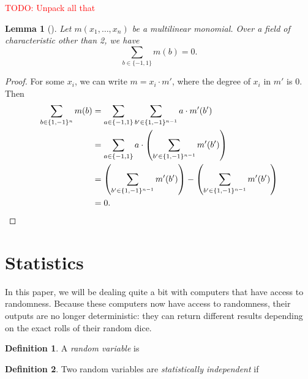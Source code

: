 \documentclass[english,12pt]{reedthesis}
\theoremstyle{plain}
\newtheorem{lemma}[lemma]{Lemma}
\theoremstyle{definition}
\newtheorem{defn}[defn]{Definition}
\theoremstyle{remark}
\newcommand{\TODO}[1]{\textcolor{red}{TODO: #1}}
\begin{document}
\TODO{Unpack all that}

\begin{lemma}[{\cite[Lemma 7]{JKRS09}}]\label{lem:monomial-sum}
  Let $m(x_{1}, \ldots, x_{n})$ be a multilinear monomial. Over a field of
  characteristic other than 2, we have
  \begin{equation}
    \sum_{b \in \{-1, 1\}}m(b) = 0.
  \end{equation}
\end{lemma}

\begin{proof}
  For some $x_{i}$, we can write $m = x_{i} \cdot m'$, where the degree of $x_{i}$
  in $m'$ is 0. Then
  \begin{align*}
    \sum_{b \in \{1, -1\}^{n}}m(b)
    &= \sum_{a \in \{-1, 1\}}\sum_{b' \in \{1, -1\}^{n-1}}a \cdot m'(b') \\
    &= \sum_{a \in \{-1, 1\}} a \cdot \mleft(\sum_{b' \in \{1, -1\}^{n-1}} m'(b')\mright) \\
    &= \mleft(\sum_{b' \in \{1, -1\}^{n-1}} m'(b')\mright) - \mleft(\sum_{b' \in \{1, -1\}^{n-1}} m'(b')\mright) \\
    &= 0.
  \end{align*}
\end{proof}

\section{Statistics}

In this paper, we will be dealing quite a bit with computers that have access to
randomness. Because these computers now have access to randomness, their outputs
are no longer deterministic: they can return different results depending on the
exact rolls of their random dice.

\begin{defn}\label{def:random-var}
  A \emph{random variable} is %
\end{defn}

\begin{defn}\label{def:stat-indep}
  Two random variables are \emph{statistically independent} if
\end{defn}


\end{document}
